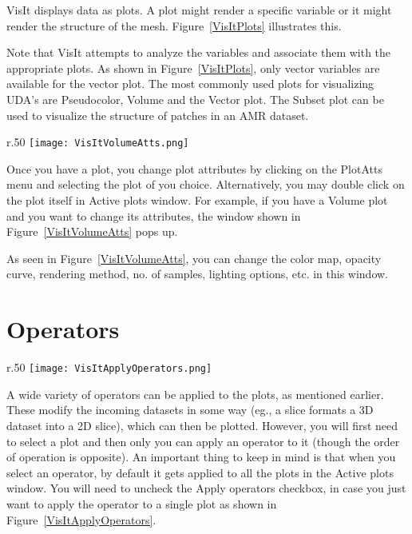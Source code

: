 VisIt displays data as plots. A plot might render a specific variable
or it might render the structure of the mesh. Figure~\ref{VisItPlots}
illustrates this.


Note that VisIt attempts to analyze the variables and associate them
with the appropriate plots. As shown in Figure~\ref{VisItPlots}, only
vector variables are available for the vector plot. The most commonly
used plots for visualizing UDA's are Pseudocolor, Volume and the
Vector plot. The Subset plot can be used to visualize the structure of
patches in an AMR dataset.

\begin{wrapfigure}{r}{.50\textwidth}
  \vspace{-20pt}
  \center
  \texttt{[image: VisItVolumeAtts.png]}
  \vspace{-10pt}
  \caption{Volume plot attributes in VisIt}
  \vspace{-40pt}
  \label{VisItVolumeAtts}
\end{wrapfigure}


Once you have a plot, you change plot attributes by clicking on the
PlotAtts menu and selecting the plot of you choice. Alternatively, you
may double click on the plot itself in Active plots window. For
example, if you have a Volume plot and you want to change its
attributes, the window shown in Figure~\ref{VisItVolumeAtts} pops up.



As seen in Figure~\ref{VisItVolumeAtts}, you can change the color map,
opacity curve, rendering method, no. of samples, lighting options,
etc. in this window.



\section{Operators}

\begin{wrapfigure}{r}{.50\textwidth}
  \vspace{-20pt}
  \center
  \texttt{[image: VisItApplyOperators.png]}
  \vspace{-10pt}
  \caption{Unchecking "selection to all plots"}
  \vspace{-10pt}
  \label{VisItApplyOperators}
\end{wrapfigure}


A wide variety of operators can be applied to the plots, as mentioned
earlier. These modify the incoming datasets in some way (eg., a slice
formats a 3D dataset into a 2D slice), which can then be
plotted. However, you will first need to select a plot and then only
you can apply an operator to it (though the order of operation is
opposite). An important thing to keep in mind is that when you select
an operator, by default it gets applied to all the plots in the Active
plots window. You will need to uncheck the Apply operators checkbox,
in case you just want to apply the operator to a single plot as shown
in Figure~\ref{VisItApplyOperators}.


